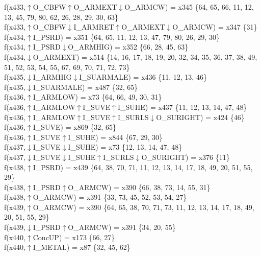 f(x433,$\uparrow$O\_CBFW$\uparrow$O\_ARMEXT$\downarrow$O\_ARMCW) = x345 \{64, 65, 66, 11, 12, 13, 45, 79, 80, 62, 26, 28, 29, 30, 63\} \\  
f(x433,$\uparrow$O\_CBFW$\downarrow$I\_ARMRET$\uparrow$O\_ARMEXT$\downarrow$O\_ARMCW) = x347 \{31\} \\  
f(x434,$\uparrow$I\_PSRD) = x351 \{64, 65, 11, 12, 13, 47, 79, 80, 26, 29, 30\} \\  
f(x434,$\uparrow$I\_PSRD$\downarrow$O\_ARMHIG) = x352 \{66, 28, 45, 63\} \\  
f(x434,$\downarrow$O\_ARMEXT) = x514 \{14, 16, 17, 18, 19, 20, 32, 34, 35, 36, 37, 38, 49, 51, 52, 53, 54, 55, 67, 69, 70, 71, 72, 73\} \\  
f(x435,$\downarrow$I\_ARMHIG$\downarrow$I\_SUARMALE) = x436 \{11, 12, 13, 46\} \\  
f(x435,$\downarrow$I\_SUARMALE) = x487 \{32, 65\} \\  
f(x436,$\uparrow$I\_ARMLOW) = x73 \{64, 66, 49, 30, 31\} \\  
f(x436,$\uparrow$I\_ARMLOW$\uparrow$I\_SUVE$\uparrow$I\_SUHE) = x437 \{11, 12, 13, 14, 47, 48\} \\  
f(x436,$\uparrow$I\_ARMLOW$\uparrow$I\_SUVE$\uparrow$I\_SURLS$\downarrow$O\_SURIGHT) = x424 \{46\} \\  
f(x436,$\uparrow$I\_SUVE) = x869 \{32, 65\} \\  
f(x436,$\uparrow$I\_SUVE$\uparrow$I\_SUHE) = x844 \{67, 29, 30\} \\  
f(x437,$\downarrow$I\_SUVE$\downarrow$I\_SUHE) = x73 \{12, 13, 14, 47, 48\} \\  
f(x437,$\downarrow$I\_SUVE$\downarrow$I\_SUHE$\uparrow$I\_SURLS$\downarrow$O\_SURIGHT) = x376 \{11\} \\  
f(x438,$\uparrow$I\_PSRD) = x439 \{64, 38, 70, 71, 11, 12, 13, 14, 17, 18, 49, 20, 51, 55, 29\} \\  
f(x438,$\uparrow$I\_PSRD$\uparrow$O\_ARMCW) = x390 \{66, 38, 73, 14, 55, 31\} \\  
f(x438,$\uparrow$O\_ARMCW) = x391 \{33, 73, 45, 52, 53, 54, 27\} \\  
f(x439,$\uparrow$O\_ARMCW) = x390 \{64, 65, 38, 70, 71, 73, 11, 12, 13, 14, 17, 18, 49, 20, 51, 55, 29\} \\  
f(x439,$\downarrow$I\_PSRD$\uparrow$O\_ARMCW) = x391 \{34, 20, 55\} \\  
f(x440,$\uparrow$ConcUP) = x173 \{66, 27\} \\  
f(x440,$\uparrow$I\_METAL) = x87 \{32, 45, 62\} \\  
